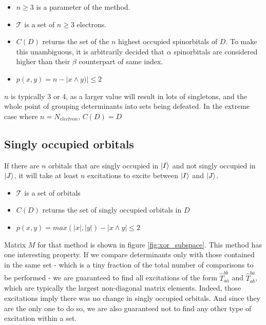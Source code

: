 \documentclass[./thesis.tex]{subfiles}
\begin{document}
\begin{itemize}
	\item
$n \geq 3$ is a parameter of the method. 
	\item
$\mathcal{T}$ is a set of $n \geq 3$ electrons. 
	\item
$C(D)$ returns the set of the $n$ highest occupied spinorbitals of $D$. To make this unambiguous, it is arbitrarily decided that $\alpha$ spinorbitals are considered higher than their $\beta$ counterpart of same index.
	\item
$p(x, y) = n - |x \wedge y)| \leq 2$
\end{itemize}

$n$ is typically 3 or 4, as a larger value will result in lots of singletons, and the whole point of grouping determinants into sets being defeated. In the extreme case where $n = N_{electron}$, $C(D) = D$
   


\subsection{Singly occupied orbitals}
If there are $n$ orbitals that are singly occupied in $\ket I$ and not singly occupied in $\ket J$, it will take at least $n$ excitations to excite between $\ket I$ and $\ket J$.

\begin{itemize}
	\item
$\mathcal{T}$ is a set of orbitals
	\item
$C(D)$ returns the set of singly occupied orbitals in $D$
	\item
$p(x, y) = max (|x|, |y|) - |x \wedge y| \leq 2$
\end{itemize}

Matrix $M$ for that method is shown in figure \ref{fig:xor_subspace}.
This method has one interesting property. If we compare determinants only with those contained in the same set - which is a tiny fraction of the total number of comparisons to be performed - we are guaranteed to find all excitations of the form $\hat T_{a \bar a}^{b \bar b}$ and $\hat T_{a \bar b}^{b \bar a}$, which are typically the largest non-diagonal matrix elements. Indeed, those excitations imply there was no change in singly occupied orbitals. And since they are the only one to do so, we are also guaranteed not to find any other type of excitation within a set.
\end{document}
